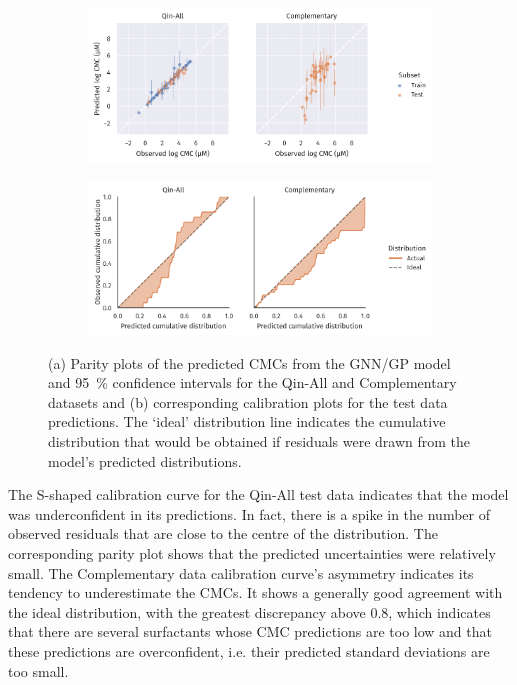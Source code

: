 \begin{figure}
    \centering
    \begin{subfigure}{\textwidth}
        \includegraphics[width=\textwidth]{images/uq-parity.pdf}
        \caption{}
        \label{fig:uq-parity}
    \end{subfigure}
    \begin{subfigure}{\textwidth}
        \includegraphics[width=\textwidth]{images/uq-calibration.pdf}
        \caption{}
        \label{fig:uq-calibration}
    \end{subfigure}
    \caption{(a) Parity plots of the predicted CMCs from the GNN/GP model and \SI{95}{\%}
        confidence intervals for the Qin-All and Complementary datasets and (b)
        corresponding calibration plots for the test data predictions. The
        `ideal' distribution line indicates the cumulative distribution that
        would be obtained if residuals were drawn from the model's predicted
        distributions.}
\end{figure}

The S-shaped calibration curve for the Qin-All test data indicates that the
model was underconfident in its predictions. In fact, there is a spike in the
number of observed residuals that are close to the centre of the distribution.
The corresponding parity plot shows that the predicted uncertainties were
relatively small. The Complementary data calibration curve's asymmetry indicates its
tendency to underestimate the CMCs. It shows a generally good agreement with the
ideal distribution, with the greatest discrepancy above \num{0.8}, which
indicates that there are several surfactants whose CMC predictions are too low
and that these predictions are overconfident, i.e. their predicted standard
deviations are too small.

